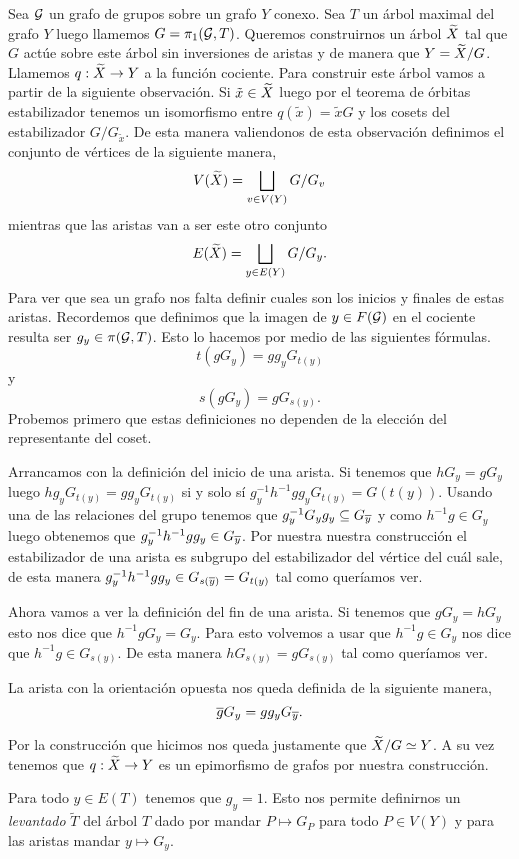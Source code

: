\documentclass[tesis.tex]{subfiles}
\begin{document}
Sea ${\cal G}$ un grafo de grupos sobre un grafo $Y$ conexo. 
Sea $T$ un árbol maximal del grafo $Y$ luego llamemos $G = \pi_1({\cal G},T)$.
Queremos construirnos un árbol $\widetilde X$ tal que $G$ actúe sobre este árbol sin inversiones de aristas y de manera que $Y = \widetilde X / G$.
Llamemos $q:\widetilde X \to Y$ a la función cociente.
Para construir este árbol vamos a partir de la siguiente observación.
Si $\tilde x \in \widetilde X$ luego por el teorema de órbitas estabilizador tenemos un isomorfismo entre $q(\tilde x) = \tilde x G$ y los cosets del estabilizador $G / G_{\tilde x}$.
De esta manera valiendonos de esta observación definimos el conjunto de vértices de la siguiente manera,
\[
V(\widetilde X) = \bigsqcup_{v \in V(Y)} G/G_{v}
\]
mientras que las aristas van a ser este otro conjunto
\[
E(\widetilde X) = \bigsqcup_{y \in E(Y)} G/G_{y}.
\]
Para ver que sea un grafo nos falta definir cuales son los inicios y finales de estas aristas.
Recordemos que definimos que la imagen de $y \in F({\cal G})$ en el cociente resulta ser $g_{y} \in \pi({\cal G},T)$. 
Esto lo hacemos por medio de las siguientes fórmulas.
\[
t(gG_{y}) = gg_{y}G_{t(y)}
\]
y 
\[
s(gG_{y}) = gG_{s(y)}.
\]
Probemos primero que estas definiciones no dependen de la elección del representante del coset.

Arrancamos con la definición del inicio de una arista.
Si tenemos que $hG_{y} = gG_{y}$ luego $hg_{y}G_{t(y)} = gg_{y}G_{t(y)}$ si y solo sí $g^{-1}_y h^{-1}g g_{y} G_{t(y)} = G(t(y))$.
Usando una de las relaciones del grupo tenemos que $g_{y}^{-1} G_{y} g_{y} \subseteq G_{\overline y}$ y como $h^{-1}g \in G_{y}$ luego obtenemos que $g^{-1}_y h^{-1}g g_{y} \in G_{\overline y}$.
Por nuestra nuestra construcción el estabilizador de una arista es subgrupo del estabilizador del vértice del cuál sale, de esta manera $g^{-1}_y h^{-1}g g_{y}  \in G_{s(\overline y)} = G_{t(y)}$ tal como queríamos ver.

Ahora vamos a ver la definición del fin de una arista.
Si tenemos que $gG_{y} = hG_{y}$ esto nos dice que $h^{-1}gG_{y} = G_{y}$.
Para esto volvemos a usar que $h^{-1}g \in G_y$ nos dice que $h^{-1}g \in G_{s(y)}$.
De esta manera $hG_{s(y)} = gG_{s(y)}$ tal como queríamos ver.

La arista con la orientación opuesta nos queda definida de la siguiente manera,
\[
\overline gG_{y} = gg_{y} G_{\overline y}.
\]

Por la construcción que hicimos nos queda justamente que $\widetilde X / G \simeq Y$.
A su vez tenemos que $q:\widetilde X \to Y$ es un epimorfismo de grafos por nuestra construcción.

\begin{obs}
	Para todo $y \in E(T)$ tenemos que $g_y=1$. 
	Esto nos permite definirnos un \emph{levantado} $\widetilde{T}$ del árbol $T$ dado por mandar $P \mapsto  G_P$ para todo $P \in V(Y)$ y para las aristas mandar $y \mapsto  G_y$. 
\end{obs}
\end{document}
